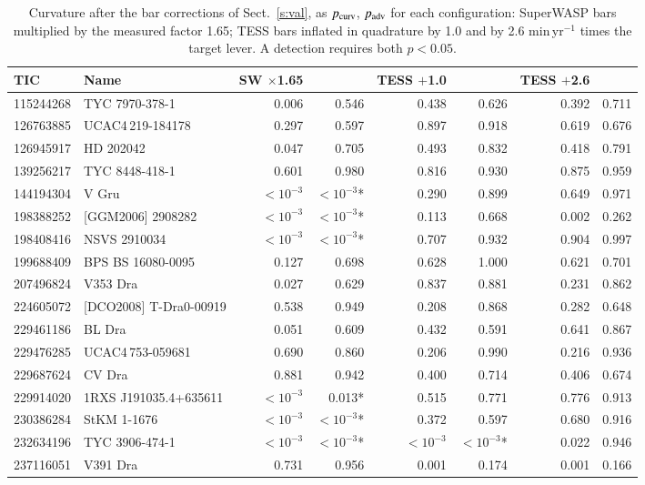 \documentclass{aa}
\begin{document}
\begin{table}
\caption{Curvature after the bar corrections of Sect.~\ref{s:val}, as $p_{\rm curv}$, $p_{\rm adv}$ for each configuration: SuperWASP bars multiplied by the measured factor 1.65; TESS bars inflated in quadrature by 1.0 and by 2.6 min\,yr$^{-1}$ times the target lever. A detection requires both $p<0.05$.}
\label{t:barras}
\centering
\tiny
\begin{tabular}{l l r r r r r r}
\hline\hline
TIC & Name & SW $\times$1.65 &  & TESS $+$1.0 &  & TESS $+$2.6 & \\
\hline
115244268 & TYC 7970-378-1 & 0.006 & 0.546 & 0.438 & 0.626 & 0.392 & 0.711\\
126763885 & UCAC4\,219-184178 & 0.297 & 0.597 & 0.897 & 0.918 & 0.619 & 0.676\\
126945917 & HD 202042 & 0.047 & 0.705 & 0.493 & 0.832 & 0.418 & 0.791\\
139256217 & TYC 8448-418-1 & 0.601 & 0.980 & 0.816 & 0.930 & 0.875 & 0.959\\
144194304 & V Gru & $<10^{-3}$ & $<10^{-3}$* & 0.290 & 0.899 & 0.649 & 0.971\\
198388252 & [GGM2006] 2908282 & $<10^{-3}$ & $<10^{-3}$* & 0.113 & 0.668 & 0.002 & 0.262\\
198408416 & NSVS 2910034 & $<10^{-3}$ & $<10^{-3}$* & 0.707 & 0.932 & 0.904 & 0.997\\
199688409 & BPS BS 16080-0095 & 0.127 & 0.698 & 0.628 & 1.000 & 0.621 & 0.701\\
207496824 & V353 Dra & 0.027 & 0.629 & 0.837 & 0.881 & 0.231 & 0.862\\
224605072 & [DCO2008] T-Dra0-00919 & 0.538 & 0.949 & 0.208 & 0.868 & 0.282 & 0.648\\
229461186 & BL Dra & 0.051 & 0.609 & 0.432 & 0.591 & 0.641 & 0.867\\
229476285 & UCAC4\,753-059681 & 0.690 & 0.860 & 0.206 & 0.990 & 0.216 & 0.936\\
229687624 & CV Dra & 0.881 & 0.942 & 0.400 & 0.714 & 0.406 & 0.674\\
229914020 & 1RXS J191035.4+635611 & $<10^{-3}$ & 0.013* & 0.515 & 0.771 & 0.776 & 0.913\\
230386284 & StKM 1-1676 & $<10^{-3}$ & $<10^{-3}$* & 0.372 & 0.597 & 0.680 & 0.916\\
232634196 & TYC 3906-474-1 & $<10^{-3}$ & $<10^{-3}$* & $<10^{-3}$ & $<10^{-3}$* & 0.022 & 0.946\\
237116051 & V391 Dra & 0.731 & 0.956 & 0.001 & 0.174 & 0.001 & 0.166\\

\end{tabular}
\end{table}
\end{document}
